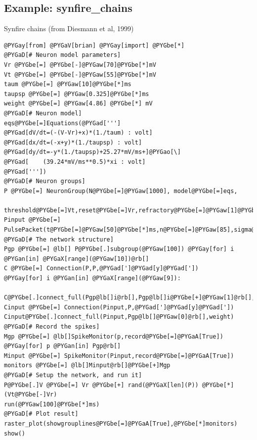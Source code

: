 \documentclass[letterpaper,10pt]{manual}
\begin{document}
\resetcurrentobjects
{}

\hypertarget{index-56}{}\subsection{Example: synfire\_chains}

Synfire chains (from Diesmann et al, 1999)

\begin{Verbatim}[commandchars=@\[\]]
@PYGay[from] @PYGaV[brian] @PYGay[import] @PYGbe[*]
@PYGaD[# Neuron model parameters]
Vr @PYGbe[=] @PYGbe[-]@PYGaw[70]@PYGbe[*]mV
Vt @PYGbe[=] @PYGbe[-]@PYGaw[55]@PYGbe[*]mV
taum @PYGbe[=] @PYGaw[10]@PYGbe[*]ms
taupsp @PYGbe[=] @PYGaw[0.325]@PYGbe[*]ms
weight @PYGbe[=] @PYGaw[4.86] @PYGbe[*] mV
@PYGaD[# Neuron model]
eqs@PYGbe[=]Equations(@PYGad[''']
@PYGad[dV/dt=(-(V-Vr)+x)*(1./taum) : volt]
@PYGad[dx/dt=(-x+y)*(1./taupsp) : volt]
@PYGad[dy/dt=-y*(1./taupsp)+25.27*mV/ms+]@PYGao[\]
@PYGad[    (39.24*mV/ms**0.5)*xi : volt]
@PYGad['''])
@PYGaD[# Neuron groups]
P @PYGbe[=] NeuronGroup(N@PYGbe[=]@PYGaw[1000], model@PYGbe[=]eqs,
    threshold@PYGbe[=]Vt,reset@PYGbe[=]Vr,refractory@PYGbe[=]@PYGaw[1]@PYGbe[*]ms)
Pinput @PYGbe[=] PulsePacket(t@PYGbe[=]@PYGaw[50]@PYGbe[*]ms,n@PYGbe[=]@PYGaw[85],sigma@PYGbe[=]@PYGaw[1]@PYGbe[*]ms)
@PYGaD[# The network structure]
Pgp @PYGbe[=] @lb[] P@PYGbe[.]subgroup(@PYGaw[100]) @PYGay[for] i @PYGan[in] @PYGaX[range](@PYGaw[10])@rb[]
C @PYGbe[=] Connection(P,P,@PYGad[']@PYGad[y]@PYGad['])
@PYGay[for] i @PYGan[in] @PYGaX[range](@PYGaw[9]):
    C@PYGbe[.]connect_full(Pgp@lb[]i@rb[],Pgp@lb[]i@PYGbe[+]@PYGaw[1]@rb[],weight)
Cinput @PYGbe[=] Connection(Pinput,P,@PYGad[']@PYGad[y]@PYGad['])
Cinput@PYGbe[.]connect_full(Pinput,Pgp@lb[]@PYGaw[0]@rb[],weight)
@PYGaD[# Record the spikes]
Mgp @PYGbe[=] @lb[]SpikeMonitor(p,record@PYGbe[=]@PYGaA[True]) @PYGay[for] p @PYGan[in] Pgp@rb[]
Minput @PYGbe[=] SpikeMonitor(Pinput,record@PYGbe[=]@PYGaA[True])
monitors @PYGbe[=] @lb[]Minput@rb[]@PYGbe[+]Mgp
@PYGaD[# Setup the network, and run it]
P@PYGbe[.]V @PYGbe[=] Vr @PYGbe[+] rand(@PYGaX[len](P)) @PYGbe[*] (Vt@PYGbe[-]Vr)
run(@PYGaw[100]@PYGbe[*]ms)
@PYGaD[# Plot result]
raster_plot(showgrouplines@PYGbe[=]@PYGaA[True],@PYGbe[*]monitors)
show()
\end{Verbatim}
\end{document}
